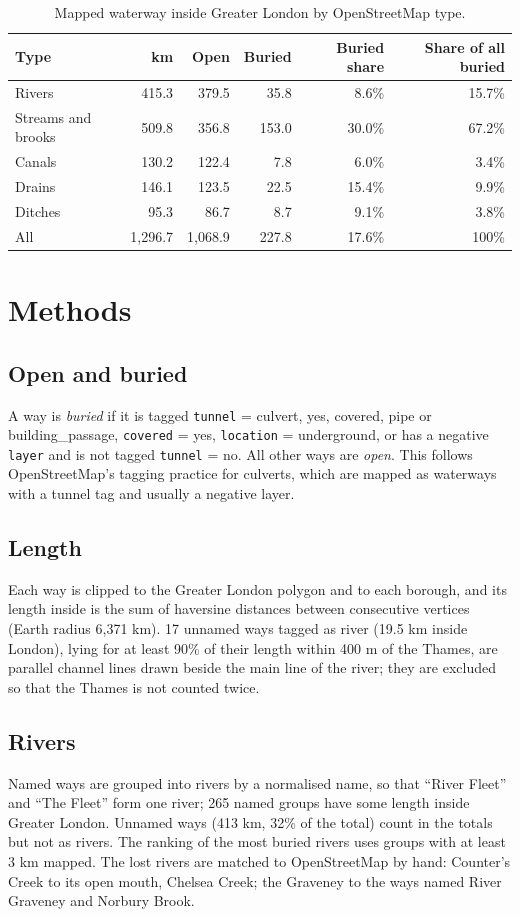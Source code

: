 \documentclass[11pt,a4paper]{article}
\begin{document}
\begin{table}[tbp]\centering\small\caption{Mapped waterway inside Greater London by OpenStreetMap type.}\label{tab:types}\begin{tabular}{lrrrrr}\toprule Type & km & Open & Buried & Buried share & Share of all buried\\\midrule
Rivers & 415.3 & 379.5 & 35.8 & 8.6\% & 15.7\%\\
Streams and brooks & 509.8 & 356.8 & 153.0 & 30.0\% & 67.2\%\\
Canals & 130.2 & 122.4 & 7.8 & 6.0\% & 3.4\%\\
Drains & 146.1 & 123.5 & 22.5 & 15.4\% & 9.9\%\\
Ditches & 95.3 & 86.7 & 8.7 & 9.1\% & 3.8\%\\
\midrule All & 1,296.7 & 1,068.9 & 227.8 & 17.6\% & 100\%\\
\bottomrule\end{tabular}\end{table}

\section{Methods}
\subsection{Open and buried}
A way is \emph{buried} if it is tagged \texttt{tunnel} = culvert, yes, covered, pipe or building\_passage, \texttt{covered} = yes, \texttt{location} = underground, or has a negative \texttt{layer} and is not tagged \texttt{tunnel} = no. All other ways are \emph{open}. This follows OpenStreetMap's tagging practice for culverts, which are mapped as waterways with a tunnel tag and usually a negative layer.

\subsection{Length}
Each way is clipped to the Greater London polygon and to each borough, and its length inside is the sum of haversine distances between consecutive vertices (Earth radius 6,371 km). 17 unnamed ways tagged as river (19.5 km inside London), lying for at least 90\% of their length within 400 m of the Thames, are parallel channel lines drawn beside the main line of the river; they are excluded so that the Thames is not counted twice.

\subsection{Rivers}
Named ways are grouped into rivers by a normalised name, so that ``River Fleet'' and ``The Fleet'' form one river; 265 named groups have some length inside Greater London. Unnamed ways (413 km, 32\% of the total) count in the totals but not as rivers. The ranking of the most buried rivers uses groups with at least 3 km mapped. The lost rivers are matched to OpenStreetMap by hand: Counter's Creek to its open mouth, Chelsea Creek; the Graveney to the ways named River Graveney and Norbury Brook.
\end{document}
